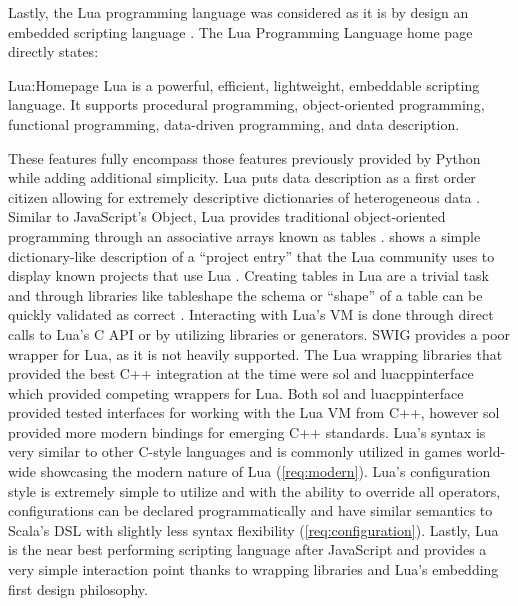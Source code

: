 Lastly, the Lua programming language was considered as it is by design an embedded scripting language \cite{Lua:Homepage}. The Lua Programming Language home page directly states: 
\begin{displayquote}{Lua:Homepage}
    Lua is a powerful, efficient, lightweight, embeddable scripting language. It supports procedural programming, object-oriented programming, functional programming, data-driven programming, and data description.
\end{displayquote}
These features fully encompass those features previously provided by Python while adding additional simplicity. Lua puts data description as a first order citizen allowing for extremely descriptive dictionaries of heterogeneous data \cite{Ierusalimschy:PIL}. Similar to JavaScript's Object, Lua provides traditional object-oriented programming through an associative arrays known as tables \cite{Ierusalimschy:PIL}.  shows a simple dictionary-like description of a ``project entry'' that the Lua community uses to display known projects that use Lua \cite{Lua:WhereIsLuaUsed}. Creating tables in Lua are a trivial task and through libraries like tableshape the schema or ``shape'' of a table can be quickly validated as correct \cite{Github:leafto:tableshape}. Interacting with Lua's VM is done through direct calls to Lua's C API or by utilizing libraries or generators. SWIG provides a poor wrapper for Lua, as it is not heavily supported. The Lua wrapping libraries that provided the best C++ integration at the time were sol \cite{Github:Rapptz:Sol} and luacppinterface \cite{Github:davidsiaw:luacppinterface} which provided competing wrappers for Lua. Both sol and luacppinterface provided tested interfaces for working with the Lua VM from C++, however sol provided more modern bindings for emerging C++ standards. Lua's syntax is very similar to other C-style languages and is commonly utilized in games world-wide showcasing the modern nature of Lua (\cref{req:modern}). Lua's configuration style is extremely simple to utilize and with the ability to override all operators, configurations can be declared programmatically and have similar semantics to Scala's DSL with slightly less syntax flexibility (\cref{req:configuration}). Lastly, Lua is the near best performing scripting language after JavaScript and provides a very simple interaction point thanks to wrapping libraries and Lua's embedding first design philosophy. 

